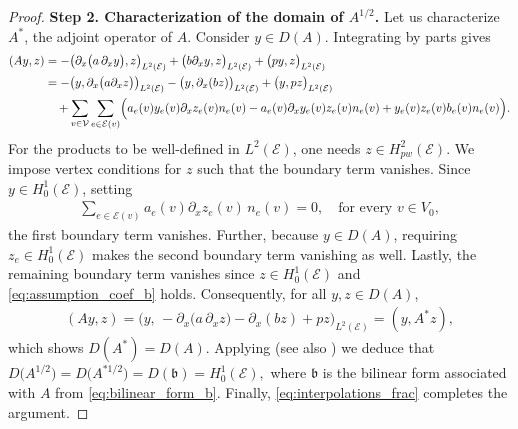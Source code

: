 \documentclass[10pt,a4paper]{amsart}
\begin{document}
\begin{proof}
\smallbreak
\noindent
\textbf{Step 2. Characterization of the domain of $A^{1/2}$.}
Let us characterize $A^*$, the adjoint operator of $A$. Consider $y \in D(A)$. Integrating by parts gives
\begin{align*}
(Ay,z)
&=
-\bigl(\partial_x\bigl(a\,\partial_x y\bigr),z\bigr)_{L^2(\mathcal{E})}
+\bigl(b\partial_x y,z\bigr)_{L^2(\mathcal{E})}
+\bigl(py,z\bigr)_{L^2(\mathcal{E})}
\\
&=
-\bigl(y,\partial_x\bigl(a\partial_x z\bigr)\bigr)_{L^2(\mathcal{E})}
-
\bigl(y,\partial_x (bz)\bigr)_{L^2(\mathcal{E})}
+
\bigl(y,pz\bigr)_{L^2(\mathcal{E})}
\\
&\quad
+\sum_{v\in \mathcal V}
\sum_{e\in \mathcal{E}(v)}
\Bigl(
a_e(v)y_e(v)\partial_x z_e(v)n_e(v)
-
a_e(v)\partial_x y_e(v)z_e(v)n_e(v)+
y_e(v)z_e(v)b_e(v)n_e(v)
\Bigr).
\end{align*}
For the products to be well-defined in $L^2(\mathcal{E})$, one needs $z\in H^2_{pw}(\mathcal{E})$. We impose vertex conditions for $z$ such that the boundary term vanishes. Since $y\in H_0^1(\mathcal{E})$, setting 
\begin{align*}
\sum_{e\in \mathcal{E}(v)} a_e(v)\partial_x z_e(v)\,n_e(v) = 0,
\quad\text{for every }v\in V_0,
\end{align*}
the first boundary term vanishes. Further, because $y\in D(A)$, requiring $z_e\in H_0^1(\mathcal{E})$ makes the second boundary term vanishing as well. Lastly, the remaining boundary term vanishes since $z\in H_0^1(\mathcal{E})$ and \eqref{eq:assumption_coef_b} holds. Consequently, for all $y,z\in D(A)$,
\begin{align*}
(Ay,z)
=
\bigl(y,\,
- \partial_x\bigl(a\,\partial_x z\bigr)
- \partial_x (bz)
+ pz
\bigr)_{L^2(\mathcal{E})}
=
(y,A^*z),
\end{align*}
which shows $D(A^*) = D(A)$. Applying \cite[Theorem~8.2]{MR2124040} (see also \cite{Lions1962EspacesDE}) we deduce that $D\bigl(A^{1/2}\bigr)
=
D\bigl(A^{*1/2}\bigr)
=
D(\mathfrak{b})
=
H_0^1(\mathcal{E}),$ where $\mathfrak{b}$ is the bilinear form associated with $A$ from \eqref{eq:bilinear_form_b}. Finally, \eqref{eq:interpolations_frac} completes the argument.
\end{proof}
\end{document}
